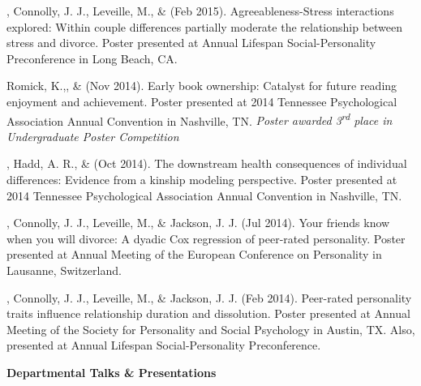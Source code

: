 \begin{etaremune}
\item\meb, Connolly, J. J., Leveille, M., \& \jjj (Feb 2015). Agreeableness-Stress interactions explored: Within couple differences partially moderate the relationship between stress and divorce. Poster presented at Annual Lifespan Social-Personality Preconference in Long Beach, CA.
%
\item Romick, K.,\noteA \meb, \& \joe (Nov 2014). Early book ownership: Catalyst for future reading enjoyment and achievement. Poster presented at 2014 Tennessee Psychological Association Annual Convention in  Nashville, TN. \textit{Poster awarded 3\textsuperscript{rd} place in Undergraduate Poster Competition}
%
\item\meb, Hadd, A. R., \& \joe (Oct 2014). The downstream health consequences of individual differences: Evidence from a kinship modeling perspective. Poster presented at 2014 Tennessee Psychological Association Annual Convention in Nashville, TN.
%

%
\item\meb, Connolly, J. J., Leveille, M., \& Jackson, J. J. (Jul 2014). Your friends know when you will divorce: A dyadic Cox regression of peer-rated personality. Poster presented at Annual Meeting of the European Conference on Personality in Lausanne, Switzerland.
%

%
\item\meb, Connolly, J. J., Leveille, M., \& Jackson, J. J. (Feb 2014). Peer-rated personality traits influence relationship duration and dissolution. Poster presented at Annual Meeting of the Society for Personality and Social Psychology in Austin, TX. Also, presented at Annual Lifespan Social-Personality Preconference.
%

%
\end{etaremune}
{\large \bf Departmental Talks \& Presentations}
